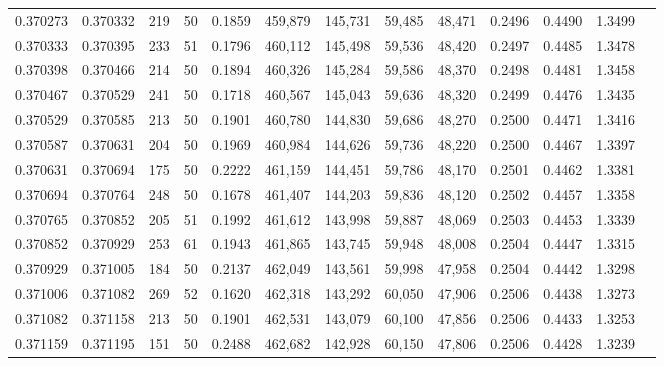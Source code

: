 \begin{tabular}{rrrrrrrrrrrrr}
0.370273 & 0.370332 &   219 &  50 &                                     0.1859 & 459,879 & 145,731 &  59,485 &  48,471 & 0.2496 & 0.4490 & 1.3499 \\
0.370333 & 0.370395 &   233 &  51 &                                     0.1796 & 460,112 & 145,498 &  59,536 &  48,420 & 0.2497 & 0.4485 & 1.3478 \\
0.370398 & 0.370466 &   214 &  50 &                                     0.1894 & 460,326 & 145,284 &  59,586 &  48,370 & 0.2498 & 0.4481 & 1.3458 \\
0.370467 & 0.370529 &   241 &  50 &                                     0.1718 & 460,567 & 145,043 &  59,636 &  48,320 & 0.2499 & 0.4476 & 1.3435 \\
0.370529 & 0.370585 &   213 &  50 &                                     0.1901 & 460,780 & 144,830 &  59,686 &  48,270 & 0.2500 & 0.4471 & 1.3416 \\
0.370587 & 0.370631 &   204 &  50 &                                     0.1969 & 460,984 & 144,626 &  59,736 &  48,220 & 0.2500 & 0.4467 & 1.3397 \\
0.370631 & 0.370694 &   175 &  50 &                                     0.2222 & 461,159 & 144,451 &  59,786 &  48,170 & 0.2501 & 0.4462 & 1.3381 \\
0.370694 & 0.370764 &   248 &  50 &                                     0.1678 & 461,407 & 144,203 &  59,836 &  48,120 & 0.2502 & 0.4457 & 1.3358 \\
0.370765 & 0.370852 &   205 &  51 &                                     0.1992 & 461,612 & 143,998 &  59,887 &  48,069 & 0.2503 & 0.4453 & 1.3339 \\
0.370852 & 0.370929 &   253 &  61 &                                     0.1943 & 461,865 & 143,745 &  59,948 &  48,008 & 0.2504 & 0.4447 & 1.3315 \\
0.370929 & 0.371005 &   184 &  50 &                                     0.2137 & 462,049 & 143,561 &  59,998 &  47,958 & 0.2504 & 0.4442 & 1.3298 \\
0.371006 & 0.371082 &   269 &  52 &                                     0.1620 & 462,318 & 143,292 &  60,050 &  47,906 & 0.2506 & 0.4438 & 1.3273 \\
0.371082 & 0.371158 &   213 &  50 &                                     0.1901 & 462,531 & 143,079 &  60,100 &  47,856 & 0.2506 & 0.4433 & 1.3253 \\
0.371159 & 0.371195 &   151 &  50 &                                     0.2488 & 462,682 & 142,928 &  60,150 &  47,806 & 0.2506 & 0.4428 & 1.3239 \\

\end{tabular}
